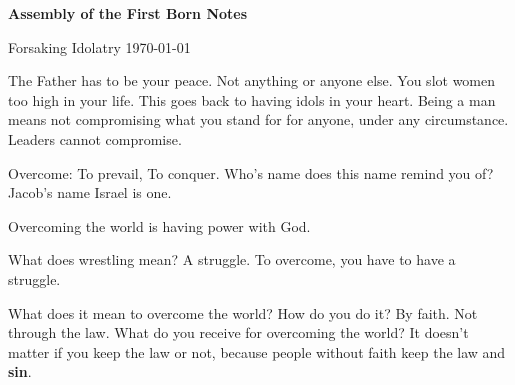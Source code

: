 \documentclass[12pt]{article}
\begin{document}
	\textbf{Assembly of the First Born \hfill Notes}

	Forsaking Idolatry \hfill \today
	
	\begin{quote}
		\BibleFirstJohnFiveTwentyOne{}
	\end{quote}

	\begin{quote}
		\BibleFirstJohnFiveOne{}
		\BibleFirstJohnFiveTwo{}
		\BibleFirstJohnFiveThree{}
		\BibleFirstJohnFiveFour{}
	\end{quote}

	\begin{quote}
		\BibleJohnSixteenThirtyTwo{}
	\end{quote}

	The Father has to be your peace. Not anything or anyone else.
	You slot women too high in your life. This goes back to having
	idols in your heart. Being a man means not compromising what
	you stand for for anyone, under any circumstance. Leaders cannot
	compromise.

	\begin{quote}
		\BibleJohnSixteenThirtyThree{}
	\end{quote}

	Overcome: To prevail, To conquer. Who's name does this name
	remind you of? Jacob's name Israel is one. 

	\begin{quote}
		\BibleGenesisThirtyTwoTwentyEight{}
	\end{quote}

	Overcoming the world is having power with God.

	\begin{quote}
		\BibleGenesisThirtyEight{}
	\end{quote}

	What does wrestling mean? A struggle. To overcome, you have
	to have a struggle.

	\begin{quote}
		\BibleActsFourteenTwentyTwo{}
	\end{quote}

	\begin{quote}
		\BibleMatthewTwentySixFortyOne{}
	\end{quote}

	What does it mean to overcome the world? How do you do
	it? By faith. Not through the law. What do you receive for
	overcoming the world? It doesn't matter if you keep the 
	law or not, because people without faith keep the law and 
	\textbf{sin}.
\end{document}
